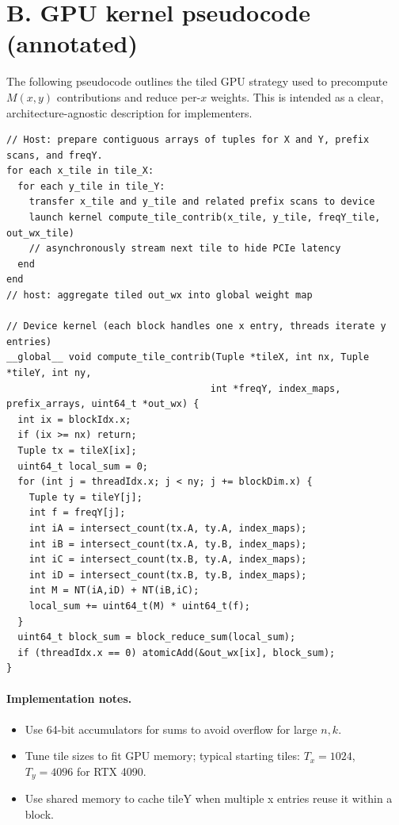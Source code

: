 \documentclass[11pt]{article}
\begin{document}
\section*{B. GPU kernel pseudocode (annotated)}

The following pseudocode outlines the tiled GPU strategy used to precompute $M(x,y)$ contributions and reduce per-$x$ weights. This is intended as a clear, architecture-agnostic description for implementers.

\begin{lstlisting}[basicstyle=\ttfamily\small,caption={Host-side batching and device kernel sketch.}]
// Host: prepare contiguous arrays of tuples for X and Y, prefix scans, and freqY.
for each x_tile in tile_X:
  for each y_tile in tile_Y:
    transfer x_tile and y_tile and related prefix scans to device
    launch kernel compute_tile_contrib(x_tile, y_tile, freqY_tile, out_wx_tile)
    // asynchronously stream next tile to hide PCIe latency
  end
end
// host: aggregate tiled out_wx into global weight map

// Device kernel (each block handles one x entry, threads iterate y entries)
__global__ void compute_tile_contrib(Tuple *tileX, int nx, Tuple *tileY, int ny,
                                    int *freqY, index_maps, prefix_arrays, uint64_t *out_wx) {
  int ix = blockIdx.x;
  if (ix >= nx) return;
  Tuple tx = tileX[ix];
  uint64_t local_sum = 0;
  for (int j = threadIdx.x; j < ny; j += blockDim.x) {
    Tuple ty = tileY[j];
    int f = freqY[j];
    int iA = intersect_count(tx.A, ty.A, index_maps);
    int iB = intersect_count(tx.A, ty.B, index_maps);
    int iC = intersect_count(tx.B, ty.A, index_maps);
    int iD = intersect_count(tx.B, ty.B, index_maps);
    int M = NT(iA,iD) + NT(iB,iC);
    local_sum += uint64_t(M) * uint64_t(f);
  }
  uint64_t block_sum = block_reduce_sum(local_sum);
  if (threadIdx.x == 0) atomicAdd(&out_wx[ix], block_sum);
}
\end{lstlisting}

\paragraph{Implementation notes.}
\begin{itemize}
\item Use 64-bit accumulators for sums to avoid overflow for large $n,k$.
\item Tune tile sizes to fit GPU memory; typical starting tiles: $T_x=1024$, $T_y=4096$ for RTX 4090.
\item Use shared memory to cache tileY when multiple x entries reuse it within a block.
\end{itemize}
\end{document}
